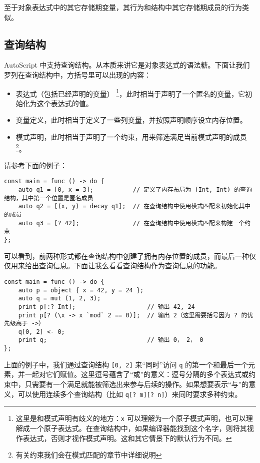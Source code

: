 至于对象表达式中的其它存储期变量，其行为和结构中其它存储期成员的行为类似。

\subsection{查询结构}

AutoScript 中支持查询结构。从本质来讲它是对象表达式的语法糖。下面让我们罗列在查询结构中，方括号里可以出现的内容：

\begin{itemize}
	\item 表达式（包括已经声明的变量） \footnote{这里是和模式声明有歧义的地方：\lstinline!x! 可以理解为一个原子模式声明，也可以理解成一个原子表达式。在查询结构中，如果编译器能找到这个名字，则将其视作表达式，否则才视作模式声明。这和其它情景下的默认行为不同。}，此时相当于声明了一个匿名的变量，它初始化为这个表达式的值。
	\item 变量定义，此时相当于定义了一些列变量，并按照声明顺序设立内存位置。
	\item 模式声明，此时相当于声明了一个约束，用来筛选满足当前模式声明的成员 \footnote{有关约束我们会在模式匹配的章节中详细说明}。
\end{itemize}

请参考下面的例子：

\begin{lstlisting}
const main = func () -> do {
	auto q1 = [0, x = 3];			// 定义了内存布局为 (Int, Int) 的查询结构，其中第一个位置是匿名成员
	auto q2 = [(x, y) = decay q1];	// 在查询结构中使用模式匹配来初始化其中的成员
	auto q3 = [? 42];				// 在查询结构中使用模式匹配来构建一个约束
};
\end{lstlisting}

可以看到，前两种形式都在查询结构中创建了拥有内存位置的成员，而最后一种仅仅用来给出查询信息。下面让我么看看查询结构作为查询信息的功能。

\begin{lstlisting}
const main = func () -> do {
	auto p = object { x = 42, y = 24 };
	auto q = mut (1, 2, 3);
	print p[:? Int];					// 输出 42, 24
	print p[? (\x -> x `mod` 2 == 0)];	// 输出 2（这里需要括号因为 ? 的优先级高于 ->）
	q[0, 2] <- 0;
	print q;							// 输出 0， 2， 0
};
\end{lstlisting}

上面的例子中，我们通过查询结构 \lstinline![0, 2]! 来“同时”访问 \lstinline!q! 的第一个和最后一个元素，并一起对它们赋值。这里逗号蕴含了“或”的意义：逗号分隔的多个表达式或约束中，只需要有一个满足就能被筛选出来参与后续的操作。如果想要表示“与”的意义，可以使用连续多个查询结构（比如 \lstinline!q[? m][? n]!）来同时要求多种约束。 \\

